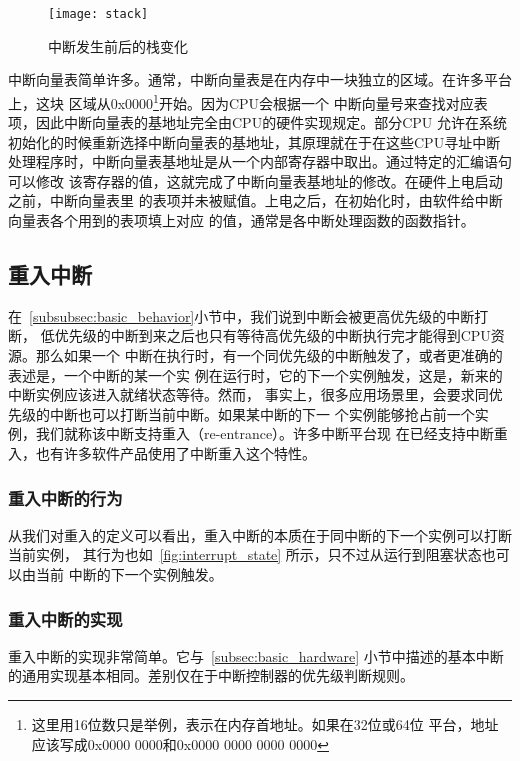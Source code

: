 \begin{figure}[H]
	\centering
	\texttt{[image: stack]}
	\caption{中断发生前后的栈变化}
	\label{fig:stack}
\end{figure}

中断向量表简单许多。通常，中断向量表是在内存中一块独立的区域。在许多平台上，这块
区域从0x0000\footnote{这里用16位数只是举例，表示在内存首地址。如果在32位或64位
平台，地址应该写成0x0000 0000和0x0000 0000 0000 0000}开始。因为CPU会根据一个
中断向量号来查找对应表项，因此中断向量表的基地址完全由CPU的硬件实现规定。部分CPU
允许在系统初始化的时候重新选择中断向量表的基地址，其原理就在于在这些CPU寻址中断
处理程序时，中断向量表基地址是从一个内部寄存器中取出。通过特定的汇编语句可以修改
该寄存器的值，这就完成了中断向量表基地址的修改。在硬件上电启动之前，中断向量表里
的表项并未被赋值。上电之后，在初始化时，由软件给中断向量表各个用到的表项填上对应
的值，通常是各中断处理函数的函数指针。

\subsection{重入中断}
\label{subsec:reentrant}

在~\ref{subsubsec:basic_behavior}小节中，我们说到中断会被更高优先级的中断打断，
低优先级的中断到来之后也只有等待高优先级的中断执行完才能得到CPU资源。那么如果一个
中断在执行时，有一个同优先级的中断触发了，或者更准确的表述是，一个中断的某一个实
例在运行时，它的下一个实例触发，这是，新来的中断实例应该进入就绪状态等待。然而，
事实上，很多应用场景里，会要求同优先级的中断也可以打断当前中断。如果某中断的下一
个实例能够抢占前一个实例，我们就称该中断支持重入（re-entrance）。许多中断平台现
在已经支持中断重入，也有许多软件产品使用了中断重入这个特性。

\subsubsection{重入中断的行为}
\label{subsubsec:reentrant_behavior}

从我们对重入的定义可以看出，重入中断的本质在于同中断的下一个实例可以打断当前实例， 
其行为也如~\ref{fig:interrupt_state} 所示，只不过从运行到阻塞状态也可以由当前
中断的下一个实例触发。

\subsubsection{重入中断的实现}
\label{subsec:reentrant_hardware}

重入中断的实现非常简单。它与~\ref{subsec:basic_hardware} 小节中描述的基本中断
的通用实现基本相同。差别仅在于中断控制器的优先级判断规则。


